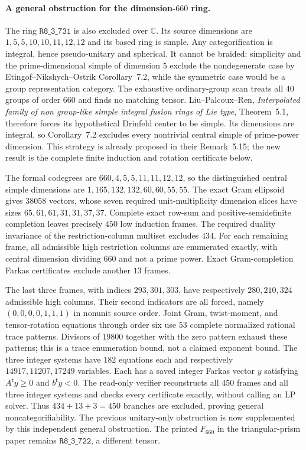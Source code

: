 \paragraph{A general obstruction for the dimension-$660$ ring.}
The ring $\mathtt{R8\_3\_731}$ is also excluded over $\mathbb C$.
Its source dimensions are $1,5,5,10,10,11,12,12$ and its based ring is
simple. Any categorification is integral, hence pseudo-unitary and
spherical. It cannot be braided: simplicity and the prime-dimensional
simple of dimension $5$ exclude the nondegenerate case by
Etingof--Nikshych--Ostrik Corollary~7.2, while the symmetric case would
be a group representation category. The exhaustive ordinary-group
scan treats all $40$ groups of order $660$ and finds no matching tensor.
Liu--Palcoux--Ren, \emph{Interpolated family of non group-like simple
integral fusion rings of Lie type}, Theorem~5.1, therefore forces its
hypothetical Drinfeld center to be simple. Its dimensions are integral,
so Corollary~7.2 excludes every nontrivial central simple of prime-power
dimension. This strategy is already proposed in their Remark~5.15;
the new result is the complete finite induction and rotation certificate
below.

The formal codegrees are $660,4,5,5,11,11,12,12$, so the distinguished
central simple dimensions are $1,165,132,132,60,60,55,55$.
The exact Gram ellipsoid gives $38058$ vectors, whose seven required
unit-multiplicity dimension slices have sizes
$65,61,61,31,31,37,37$. Complete exact row-sum and positive-semidefinite
completion leaves precisely $450$ low induction frames. The required
duality invariance of the restriction-column multiset excludes $434$.
For each remaining frame, all admissible high restriction columns are
enumerated exactly, with central dimension dividing $660$ and not a
prime power. Exact Gram-completion Farkas certificates exclude another
$13$ frames.

The last three frames, with indices $293,301,303$, have respectively
$280,210,324$ admissible high columns. Their second indicators are all
forced, namely $(0,0,0,0,1,1,1)$ in nonunit source order.
Joint Gram, twist-moment, and tensor-rotation equations through order
six use $53$ complete normalized rational trace patterns. Divisors of
$19800$ together with the zero pattern exhaust these patterns; this is
a trace enumeration bound, not a claimed exponent bound. The three
integer systems have $182$ equations each and respectively
$14917,11207,17249$ variables. Each has a saved integer Farkas vector
$y$ satisfying $A^{\mathsf t}y\geq0$ and $b^{\mathsf t}y<0$.
The read-only verifier reconstructs all $450$ frames and all three
integer systems and checks every certificate exactly, without calling
an LP solver. Thus $434+13+3=450$ branches are excluded, proving general
noncategorifiability. The previous unitary-only obstruction is now
supplemented by this independent general obstruction. The printed
$F_{660}$ in the triangular-prism paper remains
$\mathtt{R8\_3\_722}$, a different tensor.

